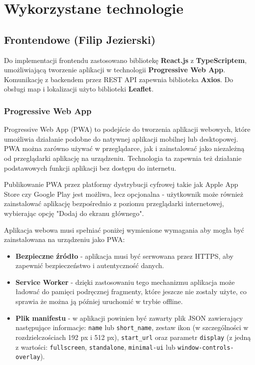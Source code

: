 \chapter{Wykorzystane technologie}
\label{chap:technology}

\section{Frontendowe (Filip Jezierski)}

Do implementacji frontendu zastosowano bibliotekę \textbf{React.js} z \textbf{TypeScriptem}, umożliwiającą tworzenie aplikacji w technologii \textbf{Progressive Web App}. Komunikację z backendem przez REST API zapewnia biblioteka \textbf{Axios}. Do obsługi map i lokalizacji użyto biblioteki \textbf{Leaflet}.

\subsection{Progressive Web App}

Progressive Web App (PWA) to podejście do tworzenia aplikacji webowych, które umożliwia działanie podobne do natywnej aplikacji mobilnej lub desktopowej. PWA można zarówno używać w przeglądarce, jak i zainstalować jako niezależną od przeglądarki aplikację na urządzeniu. Technologia ta zapewnia też działanie podstawowych funkcji aplikacji bez dostępu do internetu.

Publikowanie PWA przez platformy dystrybucji cyfrowej takie jak Apple App Store czy Google Play jest możliwa, lecz opcjonalna - użytkownik może również zainstalować aplikację bezpośrednio z poziomu przeglądarki internetowej, wybierając opcję "Dodaj do ekranu głównego".

Aplikacja webowa musi spełniać poniżej wymienione wymagania aby mogła być zainstalowana na urządzeniu jako PWA:

\begin{itemize}

    \item \textbf{Bezpieczne źródło} - aplikacja musi być serwowana przez HTTPS, aby zapewnić bezpieczeństwo i autentyczność danych.
    
    \item \textbf{Service Worker} - dzięki zastosowaniu tego mechanizmu aplikacja może ładować do pamięci podręcznej fragmenty, które jeszcze nie zostały użyte, co sprawia że można ją później uruchomić w trybie offline.
    
    \item \textbf{Plik manifestu} - w aplikacji powinien być zawarty plik JSON zawierający następujące informacje: \texttt{name} lub \texttt{short\_name}, zestaw ikon (w szczególności w rozdzielczościach 192 px i 512 px), \texttt{start\_url} oraz parametr \texttt{display} (z jedną z wartości: \texttt{fullscreen}, \texttt{standalone}, \texttt{minimal-ui} lub \texttt{window-controls-overlay}).
    
\end{itemize}

